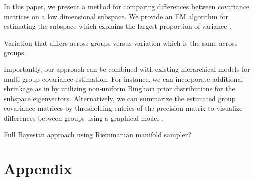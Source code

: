 \documentclass{article}
\begin{document}
In this paper, we present a method for comparing differences between
covariance matrices on a low dimensional subspace.  We provide an EM
algorithm for estimating the subspace which explains the largest
proportion of variance .

Variation that differs across groups versus variation which is the
same across groups.

Importantly, our approach can be combined with existing hierarchical
models for multi-group covariance estimation.  For instance, we can
incorporate additional shrinkage as in \citet{Hoff2009} by utilizing
non-uniform Bingham prior distributions for the subspace eigenvectors.
Alternatively, we can summarize the estimated group covariance
matrices by thresholding entries of the precision matrix to visualize
differences between groups using a graphical model \citep{}.

Full Bayesian approach using Riemmanian manifold sampler?




\section{Appendix}
\end{document}
